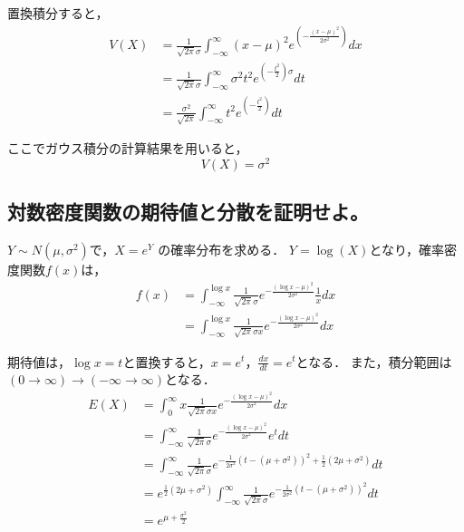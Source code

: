 \documentclass[titlepage,a4paper]{jsarticle}
\begin{document}
置換積分すると，
\begin{align}
  V(X) & = \frac{1}{\sqrt{2\pi} \sigma} \int_{-\infty}^\infty (x - \mu)^2 e^{ \left( -\frac{(x - \mu)^2}{2\sigma^2} \right)} dx \\
       & = \frac{1}{\sqrt{2\pi} \sigma} \int_{-\infty}^\infty \sigma^2 t^2 e^{\left( -\frac{t^2}{2} \right) \sigma} dt          \\
       & = \frac{\sigma^2}{\sqrt{2\pi}} \int_{-\infty}^\infty t^2 e^{ \left( -\frac{t^2}{2} \right)} dt
\end{align}

ここでガウス積分の計算結果を用いると，
\[
  V(X) = \sigma^2
\]

\subsection{対数密度関数の期待値と分散を証明せよ。}
$Y \sim N(\mu, \sigma^2)$で，$X = e^Y$ の確率分布を求める．
$Y = \log(X)$となり，確率密度関数$f(x)$は，
\begin{align}
  f(x) & = \int_{-\infty}^{\log x} \frac{1}{\sqrt{2\pi} \sigma} e ^{ -\frac{(\log x - \mu)^2}{2\sigma^2} } \frac{1}{x} dx \\
       & = \int_{-\infty}^{\log x} \frac{1}{\sqrt{2\pi} \sigma x}e ^{ -\frac{(\log x - \mu)^2}{2\sigma^2} } dx
\end{align}

期待値は，$\log x = t$と置換すると，$x = e^t$，$\frac{dx}{dt} = e^t$となる．
また，積分範囲は$ (0 \to \infty) \to (-\infty \to \infty)$となる．
\begin{align*}
  E(X) & = \int_0^\infty x \frac{1}{\sqrt{2\pi}\sigma x} e^{-\frac{(\log x - \mu)^2}{2\sigma^2}}dx                                                               \\
       & = \int_{-\infty}^\infty \frac{1}{\sqrt{2\pi}\sigma} e^{-\frac{(\log x - \mu)^2}{2\sigma^2}}e^t dt                                                       \\
       & = \int_{-\infty}^\infty \frac{1}{\sqrt{2\pi}\sigma} e^{-\frac{1}{2\sigma^2} \left( t - (\mu + \sigma^2) \right)^2 + \frac{1}{2}(2\mu + \sigma^2) }dt    \\
       & = e^{\frac{1}{2}(2\mu + \sigma^2) } \int_{-\infty}^\infty \frac{1}{\sqrt{2\pi}\sigma} e^{-\frac{1}{2\sigma^2} \left( t - (\mu + \sigma^2) \right)^2 }dt \\
       & = e^{\mu + \frac{\sigma^2}{2} }
\end{align*}
\end{document}
